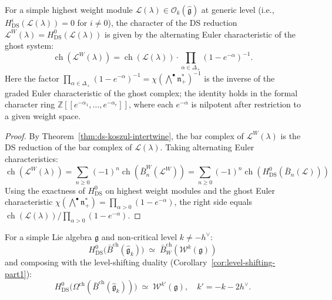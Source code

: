 \begin{corollary}
\label{cor:ds-character-compatibility}
For a simple highest weight module $\mathcal{L}(\lambda) \in
\mathcal{O}_k(\widehat{\mathfrak{g}})$ at generic level
\textup{(}i.e., $H^i_{\mathrm{DS}}(\mathcal{L}(\lambda)) = 0$
for $i \neq 0$\textup{)}, the character of the DS reduction
$\mathcal{L}^W(\lambda) = H^0_{\mathrm{DS}}(\mathcal{L}(\lambda))$
is given by the alternating Euler characteristic of the ghost
system\textup{:}
\begin{equation}\label{eq:ds-character}
\operatorname{ch}(\mathcal{L}^W(\lambda))
= \operatorname{ch}(\mathcal{L}(\lambda))
  \cdot \prod_{\alpha \in \Delta_+}(1 - e^{-\alpha})^{-1}.
\end{equation}
Here the factor
$\prod_{\alpha \in \Delta_+}(1 - e^{-\alpha})^{-1}
= \chi(\bigwedge^\bullet \mathfrak{n}_+^*)^{-1}$
is the inverse of the graded Euler characteristic of the ghost
complex; the identity holds in the formal character ring
$\mathbb{Z}[[e^{-\alpha_1}, \ldots, e^{-\alpha_r}]]$, where
each $e^{-\alpha}$ is nilpotent after restriction to a given
weight space.
\end{corollary}

\begin{proof}
By Theorem~\ref{thm:ds-koszul-intertwine}, the bar complex of
$\mathcal{L}^W(\lambda)$ is the DS reduction of the bar complex
of $\mathcal{L}(\lambda)$.  Taking alternating Euler
characteristics:
\[
\operatorname{ch}(\mathcal{L}^W(\lambda))
= \sum_{n \geq 0}(-1)^n \operatorname{ch}(\bar{B}^W_n(\mathcal{L}^W))
= \sum_{n \geq 0}(-1)^n \operatorname{ch}(H^0_{\mathrm{DS}}(\bar{B}_n(\mathcal{L})))
\]
Using the exactness of $H^0_{\mathrm{DS}}$ on highest weight
modules and the ghost Euler characteristic
$\chi(\bigwedge^\bullet \mathfrak{n}_+^*) =
\prod_{\alpha > 0}(1 - e^{-\alpha})$, the right side equals
$\operatorname{ch}(\mathcal{L}(\lambda)) /
\prod_{\alpha > 0}(1 - e^{-\alpha})$.
\end{proof}

\begin{corollary}\label{cor:ds-bar-level-shift}
For a simple Lie algebra $\mathfrak{g}$ and non-critical level $k \neq -h^\vee$:
\begin{equation}\label{eq:ds-bar-level-shift}
H^0_{\mathrm{DS}}\bigl(\bar{B}^{\mathrm{ch}}(\widehat{\mathfrak{g}}_k)\bigr) \;\simeq\; \bar{B}_W^{\mathrm{ch}}(\mathcal{W}^k(\mathfrak{g}))
\end{equation}
and composing with the level-shifting duality \textup{(}Corollary~\textup{\ref{cor:level-shifting-part1})}:
\begin{equation}\label{eq:ds-cobar-dual}
H^0_{\mathrm{DS}}\!\bigl(\Omega^{\mathrm{ch}}(\bar{B}^{\mathrm{ch}}(\widehat{\mathfrak{g}}_k))\bigr)
  \;\simeq\; \mathcal{W}^{k'}(\mathfrak{g}), \quad k' = -k - 2h^\vee.
\end{equation}
\end{corollary}

